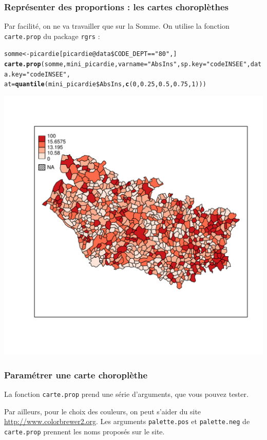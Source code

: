 \documentclass[slidetop, 10pt]{beamer}\usepackage{graphicx, color}
\makeatletter
\newcommand{\hlfunctioncall}[1]{\textcolor[rgb]{0.501960784313725,0,0.329411764705882}{\textbf{#1}}}%
\newcommand{\hlstring}[1]{\textcolor[rgb]{0.6,0.6,1}{#1}}%
\newenvironment{kframe}{%
 \def\at@end@of@kframe{}%
 \ifinner\ifhmode%
  \def\at@end@of@kframe{\end{minipage}}%
  \begin{minipage}{\columnwidth}%
 \fi\fi%
 \def\FrameCommand##1{\hskip\@totalleftmargin \hskip-\fboxsep
 \colorbox{shadecolor}{##1}\hskip-\fboxsep
     \hskip-\linewidth \hskip-\@totalleftmargin \hskip\columnwidth}%
 \MakeFramed {\advance\hsize-\width
   \@totalleftmargin\z@ \linewidth\hsize
   \@setminipage}}%
 {\par\unskip\endMakeFramed%
 \at@end@of@kframe}
\newenvironment{knitrout}{}{} %
\renewenvironment{knitrout}{\begin{tiny}}{\end{tiny}}
\makeatother
\begin{document}
\begin{frame}
\frametitle{Représenter des proportions : les cartes choroplèthes}
Par facilité, on ne va travailler que sur la Somme. On utilise la fonction \verb!carte.prop! du package \verb!rgrs! :

\begin{knitrout}\tiny
{}\color{fgcolor}\begin{kframe}
\begin{alltt}
somme <- picardie[picardie@data\$CODE_DEPT == \hlstring{"80"}, ]
\hlfunctioncall{carte.prop}(somme, mini_picardie, varname = \hlstring{"AbsIns"}, sp.key = \hlstring{"codeINSEE"}, data.key = \hlstring{"codeINSEE"}, 
    at = \hlfunctioncall{quantile}(mini_picardie\$AbsIns, \hlfunctioncall{c}(0, 0.25, 0.5, 0.75, 1)))
\end{alltt}
\end{kframe}

{\centering \includegraphics[width=.55\linewidth]{images/carteprop} 

}


\end{knitrout}



\end{frame}

\begin{frame}[fragile]
\frametitle{Paramétrer une carte choroplèthe}

La fonction \verb!carte.prop! prend une série d'arguments, que vous pouvez tester.

Par ailleurs, pour le choix des couleurs, on peut s'aider du site \url{http://www.colorbrewer2.org}. Les arguments \verb!palette.pos! et \verb!palette.neg! de \verb!carte.prop! prennent les noms proposés sur le site. 
\end{frame}
\end{document}
